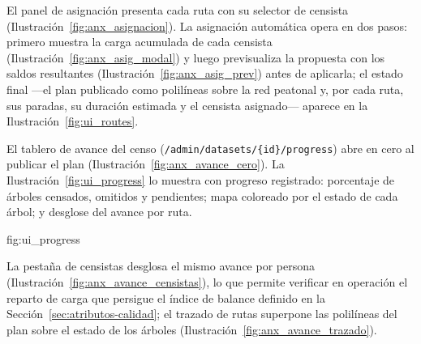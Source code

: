 

El panel de asignación presenta cada ruta con su selector de censista
(Ilustración~\ref{fig:anx_asignacion}). La asignación automática opera en dos pasos: primero
muestra la carga acumulada de cada censista (Ilustración~\ref{fig:anx_asig_modal}) y luego
previsualiza la propuesta con los saldos resultantes (Ilustración~\ref{fig:anx_asig_prev}) antes de
aplicarla; el estado final ---el plan publicado como polilíneas sobre la red peatonal y, por cada
ruta, sus paradas, su duración estimada y el censista asignado--- aparece en la
Ilustración~\ref{fig:ui_routes}.





El tablero de avance del censo (\texttt{/admin/datasets/\{id\}/progress}) abre en cero al publicar
el plan (Ilustración~\ref{fig:anx_avance_cero}). La Ilustración~\ref{fig:ui_progress} lo muestra
con progreso registrado: porcentaje de árboles censados, omitidos y pendientes; mapa coloreado por
el estado de cada árbol; y desglose del avance por ruta.


%
{fig:ui_progress}

La pestaña de censistas desglosa el mismo avance por persona
(Ilustración~\ref{fig:anx_avance_censistas}), lo que permite verificar en operación el reparto de
carga que persigue el índice de balance definido en la Sección~\ref{sec:atributos-calidad}; el
trazado de rutas superpone las polilíneas del plan sobre el estado de los árboles
(Ilustración~\ref{fig:anx_avance_trazado}).

